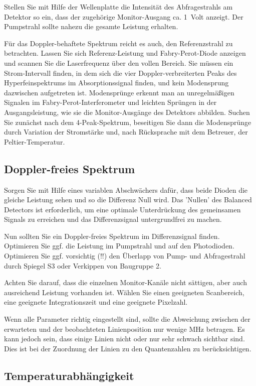 Stellen Sie mit Hilfe der Wellenplatte die Intensität des Abfragestrahls am Detektor so ein, dass der zugehörige Monitor-Ausgang ca. 1~Volt anzeigt. Der Pumpstrahl sollte nahezu die gesamte Leistung erhalten.

Für das Doppler-behaftete Spektrum reicht es auch, den Referenzstrahl zu betrachten. Lassen Sie sich Referenz-Leistung und Fabry-Perot-Diode anzeigen und scannen Sie die Laserfrequenz über den vollen Bereich. Sie müssen ein Strom-Intervall finden, in dem sich die vier Doppler-verbreiterten  Peaks des Hyperfeinspektrums im Absorptionssignal finden, und kein Modensprung dazwischen aufgetreten ist. Modensprünge erkennt man an unregelmäßigen Signalen im Fabry-Perot-Interferometer und leichten Sprüngen in der Ausgangsleistung, wie sie die Monitor-Ausgänge des Detektors abbilden. Suchen Sie zunächst nach dem 4-Peak-Spektrum, beseitigen Sie dann die Modensprünge durch Variation der Stromstärke und, nach Rücksprache mit dem Betreuer, der Peltier-Temperatur.

\subsection{Doppler-freies Spektrum}


Sorgen Sie  mit Hilfe eines variablen Abschwächers dafür, dass beide Dioden die gleiche Leistung sehen und so die Differenz Null wird. Das 'Nullen' des Balanced Detectors ist erforderlich, um eine optimale Unterdrückung des gemeinsamen Signals zu erreichen und das Differenzsignal untergrundfrei zu machen.

Nun sollten Sie ein Doppler-freies Spektrum im  Differenzsignal  finden. Optimieren Sie ggf. die Leistung im Pumpstrahl und auf den Photodioden. Optimieren Sie ggf. vorsichtig (!!) den Überlapp von Pump- und Abfragestrahl durch Spiegel S3 oder Verkippen von Baugruppe 2.

Achten Sie darauf, dass die einzelnen Monitor-Kanäle nicht sättigen, aber auch ausreichend Leistung vorhanden ist. Wählen Sie einen geeigneten Scanbereich, eine geeignete Integrationszeit und eine geeignete Pixelzahl.

Wenn alle Parameter richtig eingestellt sind, sollte die Abweichung zwischen der erwarteten und der beobachteten Linienposition nur wenige MHz betragen. Es kann jedoch sein, dass einige Linien nicht oder nur sehr schwach sichtbar sind. Dies ist bei der Zuordnung der Linien zu den Quantenzahlen zu berücksichtigen.

\subsection{Temperaturabhängigkeit}

